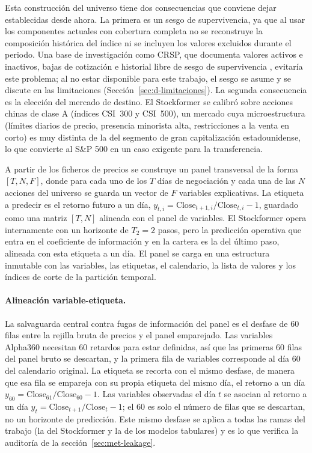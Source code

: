 Esta construcción del universo tiene dos consecuencias que conviene dejar establecidas
desde ahora. La primera es un sesgo de supervivencia, ya que al usar los componentes
actuales con cobertura completa no se reconstruye la composición histórica del índice ni se incluyen
los valores excluidos durante el periodo. Una base de investigación como CRSP, que
documenta valores activos e inactivos, bajas de cotización e historial libre de sesgo de
supervivencia \autocite{crsp2025stock}, evitaría este problema; al no estar disponible
para este trabajo, el sesgo se asume y se discute en las limitaciones
(Sección~\ref{sec:d-limitaciones}). La segunda consecuencia es la elección del mercado de
destino. El Stockformer se calibró sobre acciones chinas de clase A (índices CSI~300 y
CSI~500), un mercado cuya microestructura (límites diarios de precio, presencia minorista
alta, restricciones a la venta en corto) es muy distinta de la del segmento de gran
capitalización estadounidense, lo que convierte al S\&P 500 en un caso exigente para la
transferencia.

A partir de los ficheros de precios se construye un panel transversal de la forma
\([T, N, F]\), donde para cada uno de los \(T\) días de negociación y cada una de las
\(N\) acciones del universo se guarda un vector de \(F\) variables explicativas. La
etiqueta a predecir es el retorno futuro a un día,
\(y_{t,i} = \text{Close}_{t+1,i}/\text{Close}_{t,i}-1\), guardado como una matriz
\([T, N]\) alineada con el panel de variables. El Stockformer opera internamente con un
horizonte de \(T_2=2\) pasos, pero la predicción operativa que entra en el coeficiente de
información y en la cartera es la del último paso, alineada con esta etiqueta a un día. El
panel se carga en una estructura inmutable con las variables, las etiquetas, el
calendario, la lista de valores y los índices de corte de la partición temporal.

\paragraph{Alineación variable-etiqueta.} La salvaguarda central contra fugas de
información del panel es el desfase de 60 filas entre la rejilla bruta de precios y el
panel emparejado. Las variables Alpha360 necesitan 60 retardos para estar definidas, así
que las primeras 60 filas del panel bruto se descartan, y la primera fila de variables
corresponde al día 60 del calendario original. La etiqueta se recorta con el mismo
desfase, de manera que esa fila se empareja con su propia etiqueta del mismo día, el
retorno a un día \(y_{60}=\text{Close}_{61}/\text{Close}_{60}-1\). Las variables
observadas el día \(t\) se asocian al retorno a un día
\(y_t=\text{Close}_{t+1}/\text{Close}_t-1\); el 60 es solo el número de filas que se
descartan, no un horizonte de predicción. Este mismo desfase se aplica a todas las ramas
del trabajo (la del Stockformer y la de los modelos tabulares) y es lo que verifica la
auditoría de la sección~\ref{sec:met-leakage}.

